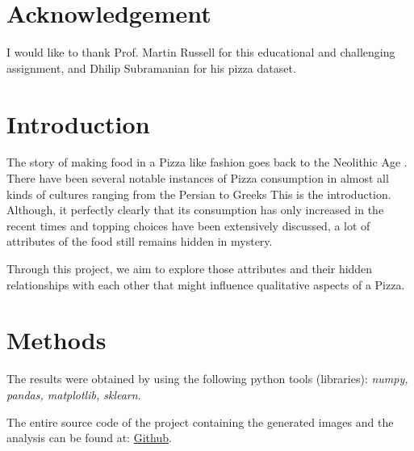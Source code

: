 \documentclass[preprint,12pt]{elsarticle}
\begin{document}
\section{Acknowledgement}
\label{s:acknowledge}
I would like to thank  Prof. Martin Russell for this educational and challenging assignment, and  Dhilip Subramanian for his pizza dataset.

\section{Introduction}
\label{s:introduction}
The story of making food in a Pizza like fashion goes back to the Neolithic Age \cite{pizzaOrigins1991}. There have been several
notable instances of Pizza consumption in almost all kinds of cultures ranging from the Persian to Greeks \cite{Persian2014} \cite{Greek2000}
This is the introduction.  Although, it perfectly clearly that its consumption has only increased in the recent times and topping choices have 
been extensively discussed, a lot of attributes of the food still remains hidden in mystery. \par
Through this project, we aim to explore those attributes and their hidden relationships with each other that might influence qualitative aspects of a Pizza.
\section{Methods}
\label{s:Methods}
The results were obtained by using the following python tools (libraries):  \textit{numpy, pandas, matplotlib, sklearn}. \cite{softwares}
\par
The entire source code of the project containing the generated images and the analysis can be found at: \href{https://github.com/amar-laksh/UNI/tree/master/assignments/IDA/assignment}{Github}.
\end{document}
